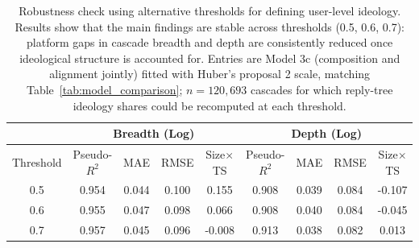 \documentclass[letterpaper]{article} %
\newcommand{\rev}[1]{{\color{blue}#1}}
\begin{document}
\begin{table}[!htbp]
\centering
\caption{Robustness check using alternative thresholds for defining user-level ideology.
Results show that the main findings are stable across thresholds (0.5, 0.6, 0.7):
platform gaps in cascade breadth and depth are consistently reduced once ideological structure is accounted for.
\rev{Entries are Model 3c (composition and alignment jointly) fitted with Huber's proposal 2 scale, matching Table~\ref{tab:model_comparison}; $n = 120{,}693$ cascades for which reply-tree ideology shares could be recomputed at each threshold.}}
\label{tab:robust_threshold}
\begin{tabular}{ccccc|cccc}
\hline
 & \multicolumn{4}{c}{Breadth (Log)} & \multicolumn{4}{c}{Depth (Log)} \\
\hline
 Threshold& Pseudo-$R^2$ & MAE & RMSE & Size$\times$TS  & Pseudo-$R^2$ & MAE & RMSE & Size$\times$TS  \\
\hline
\rev{0.5} & \rev{0.954} & \rev{0.044} & \rev{0.100} & \rev{0.155} & \rev{0.908} & \rev{0.039} & \rev{0.084} & \rev{-0.107} \\
\rev{0.6} & \rev{0.955} & \rev{0.047} & \rev{0.098} & \rev{0.066} & \rev{0.908} & \rev{0.040} & \rev{0.084} & \rev{-0.045} \\
\rev{0.7} & \rev{0.957} & \rev{0.045} & \rev{0.096} & \rev{-0.008} & \rev{0.913} & \rev{0.038} & \rev{0.082} & \rev{0.013} \\
\hline
\end{tabular}
\end{table}

\end{document}
